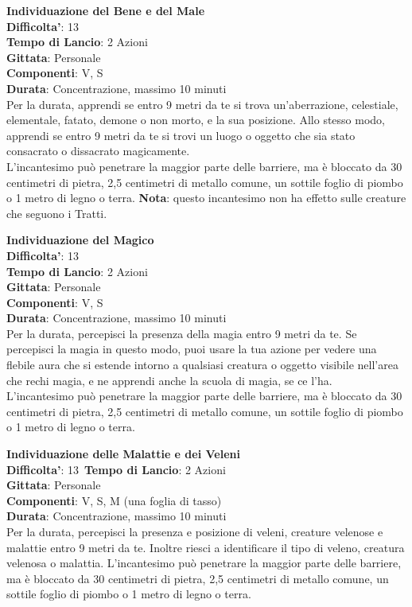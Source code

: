 \begin{multicols}{2}
\medskip\textbf{Individuazione del Bene e del Male}\\
\textbf{Difficolta'}: 13\\
\textbf{Tempo di Lancio}: 2 Azioni\\
\textbf{Gittata}: Personale\\
\textbf{Componenti}: V, S\\
\textbf{Durata}: Concentrazione, massimo 10 minuti\\
Per la durata, apprendi se entro 9 metri da te si trova un’aberrazione, celestiale, elementale, fatato, demone o non morto, e la sua posizione. Allo stesso modo, apprendi se entro 9 metri da te si trovi un luogo o oggetto che sia stato consacrato o dissacrato magicamente.\\
L’incantesimo può penetrare la maggior parte delle barriere, ma è bloccato da 30 centimetri di pietra, 2,5 centimetri di metallo comune, un sottile foglio di piombo o 1 metro di legno o terra. 
\textbf{Nota}: questo incantesimo non ha effetto sulle creature che seguono i Tratti.

\medskip\textbf{Individuazione del Magico}\\
\textbf{Difficolta'}: 13\\
\textbf{Tempo di Lancio}: 2 Azioni\\
\textbf{Gittata}: Personale\\
\textbf{Componenti}: V, S\\
\textbf{Durata}: Concentrazione, massimo 10 minuti\\
Per la durata, percepisci la presenza della magia entro 9 metri da te. Se percepisci la magia in questo modo, puoi usare la tua azione per vedere una flebile aura che  si estende intorno a qualsiasi creatura o oggetto visibile nell’area che rechi magia, e ne apprendi anche la scuola di magia, se ce l’ha.\\
L’incantesimo può penetrare la maggior parte delle barriere, ma è bloccato da 30 centimetri di pietra, 2,5 centimetri di metallo comune, un sottile foglio di piombo o 1 metro di legno o terra.

\medskip\textbf{Individuazione delle Malattie e dei Veleni}\\
\textbf{Difficolta'}: 13\
\textbf{Tempo di Lancio}: 2 Azioni\\
\textbf{Gittata}: Personale\\
\textbf{Componenti}: V, S, M (una foglia di tasso)\\
\textbf{Durata}: Concentrazione, massimo 10 minuti\\
Per la durata, percepisci la presenza e posizione di veleni, creature velenose e malattie entro 9 metri da te. Inoltre riesci a identificare il tipo di veleno, creatura velenosa o malattia. L’incantesimo può penetrare la maggior parte delle barriere, ma è bloccato da 30 centimetri di pietra, 2,5 centimetri di metallo comune, un sottile foglio di piombo o 1 metro di legno o terra.


\end{multicols}
